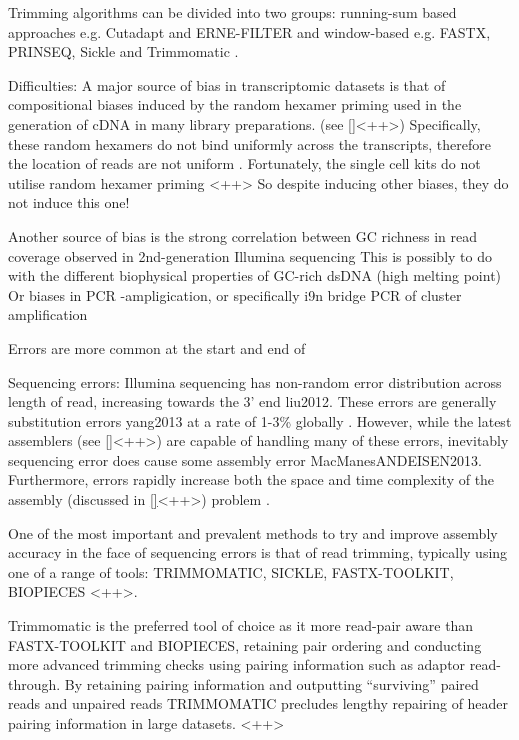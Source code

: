 Trimming algorithms can be divided into two groups: running-sum based approaches e.g. Cutadapt and ERNE-FILTER
and window-based e.g. FASTX, PRINSEQ, Sickle and Trimmomatic \citep{DelFabbro2013}.












Difficulties: 
A major source of bias in transcriptomic datasets is that of compositional biases induced
by the random hexamer priming used in the generation of cDNA in many library preparations.
(see \ref{}<++>) %
Specifically, these random hexamers do not bind uniformly across the transcripts,
therefore the location of reads are not uniform \citep{Hansen2010}\citep{Hansen2010}.
Fortunately, the single cell kits do not utilise random hexamer priming {}<++> %
So despite inducing other biases, they do not induce this one!


Another source of bias is the strong correlation between GC richness in read coverage
observed in 2nd-generation Illumina sequencing \citep{Dohm2008,}
This is possibly to do with the different biophysical properties of GC-rich dsDNA (high melting point) \citep{Dohm2008} %
Or biases in PCR -ampligication, or specifically i9n bridge PCR of cluster amplification


Errors are more common at the start and end of 




Sequencing errors: Illumina sequencing has non-random error distribution across length of read, increasing towards the 3' end liu2012. These errors are generally substitution errors yang2013 at a rate of 1-3\% globally \citep{MacManes2014}.  However, while the latest assemblers (see \ref{}<++>) are capable of %
handling many of these errors, inevitably sequencing error does cause some
assembly error MacManesANDEISEN2013.
Furthermore, errors rapidly increase both the space and time complexity of the assembly (discussed in \ref{}<++>) problem \citep{MacManes2014}.

One of the most important and prevalent methods to try and improve assembly
accuracy in the face of sequencing errors is that of read trimming, typically
using one of a range of tools: TRIMMOMATIC, SICKLE, FASTX-TOOLKIT, BIOPIECES \citep{}<++>. %

Trimmomatic is the preferred tool of choice as it more read-pair aware than
FASTX-TOOLKIT and BIOPIECES, retaining pair ordering and conducting more
advanced trimming checks using pairing information such as adaptor read-through.
By retaining pairing information and outputting ``surviving'' paired reads and
unpaired reads TRIMMOMATIC precludes lengthy repairing of header pairing information
in large datasets. \citep{}<++> %

